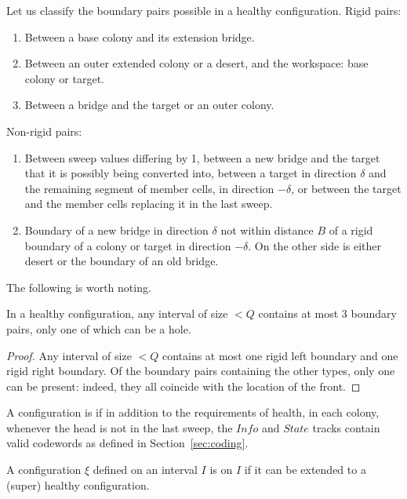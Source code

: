\documentclass[12pt]{memoir}
\newcommand{\fld}[1]{\ensuremath{\textit{#1}}}
\def\B{B}
\newcommand{\Info}{\fld{Info}}
\newcommand{\State}{\fld{State}}
\begin{document}
Let us classify the boundary pairs possible in a healthy configuration.
Rigid pairs:

\begin{enumerate}[(r1)]
\item\label{i:rigid.base-bridge} Between a base colony and its extension bridge.
\item\label{i:rigid.outer-workspace}
Between an outer extended colony or a desert, and the workspace: base colony or target.
\item\label{i:rigid.bridge-target} Between a bridge and the target or an outer colony.
\end{enumerate}

Non-rigid pairs:

\begin{enumerate}[(nr1)]
  \item\label{i:nonrigid.sweep} Between sweep values differing by 1,
between a new bridge and the target that it is possibly being converted into,
between a target in direction \( \delta \) and 
the remaining segment of member cells, in direction \( -\delta \),
or between the target and the member cells replacing it in the last sweep.

  \item\label{i:nonrigid.bridge-bridge} Boundary of a new bridge in direction \( \delta \)
not within distance \( \B \) of a rigid boundary of a colony or target in direction \( -\delta \).
On the other side is either desert or the boundary of an old bridge.

\end{enumerate}

The following is worth noting.

\begin{lemma}
In a healthy configuration, any interval of size \( <Q \) contains at most 3 boundary pairs,
only one of which can be  a hole.
\end{lemma}
\begin{proof}
Any interval of size \( <Q \) contains at most one rigid left boundary and
one rigid right boundary.
Of the boundary pairs containing the other
types, only one can be present: indeed, they all coincide with the location of the front.
\end{proof}


 \begin{definition}\label{def:super-healthy}
A configuration is   if in addition to the requirements of health, in each colony,
whenever the head is not in the last sweep,
the \( \Info \) and \( \State \) tracks contain valid codewords as
defined in Section~\ref{sec:coding}.

A configuration \( \xi \) defined on an interval \( I \) is  on \( I \) if 
it can be extended to a (super) healthy configuration.
 \end{definition}
\end{document}
